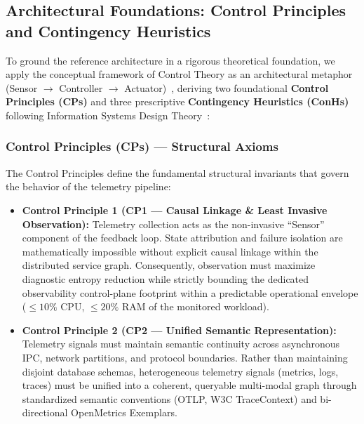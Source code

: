 \subsection{Architectural Foundations: Control Principles and Contingency Heuristics}
To ground the reference architecture in a rigorous theoretical foundation, we apply the conceptual framework of Control Theory as an architectural metaphor (Sensor $\rightarrow$ Controller $\rightarrow$ Actuator)~\cite{wieringa_2014}, deriving two foundational \textbf{Control Principles (CPs)} and three prescriptive \textbf{Contingency Heuristics (ConHs)} following Information Systems Design Theory~\cite{walls_1992}:

\subsubsection{Control Principles (CPs) — Structural Axioms}
The Control Principles define the fundamental structural invariants that govern the behavior of the telemetry pipeline:
\begin{itemize}[leftmargin=1.2em, itemsep=2pt, topsep=3pt]
    \item \textbf{Control Principle 1 (CP1 — Causal Linkage \& Least Invasive Observation):} Telemetry collection acts as the non-invasive ``Sensor'' component of the feedback loop. State attribution and failure isolation are mathematically impossible without explicit causal linkage within the distributed service graph. Consequently, observation must maximize diagnostic entropy reduction while strictly bounding the dedicated observability control-plane footprint within a predictable operational envelope ($\le 10\%$ CPU, $\le 20\%$ RAM of the monitored workload).
    \item \textbf{Control Principle 2 (CP2 — Unified Semantic Representation):} Telemetry signals must maintain semantic continuity across asynchronous IPC, network partitions, and protocol boundaries. Rather than maintaining disjoint database schemas, heterogeneous telemetry signals (metrics, logs, traces) must be unified into a coherent, queryable multi-modal graph through standardized semantic conventions (OTLP, W3C TraceContext) and bi-directional OpenMetrics Exemplars.
\end{itemize}


